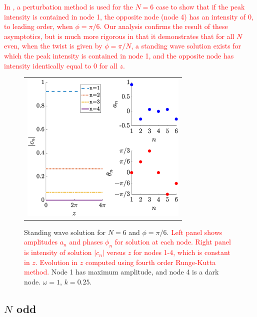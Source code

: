 \documentclass[reprint, amsmath,amssymb,aps,pra]{revtex4-2}
\renewcommand{\revised}[1]{ \textcolor{red}{#1} }
\begin{document}
\revised{In \cite{castro2016}, a perturbation method is used for the $N=6$ case to show that if the peak intensity is contained in node 1, the opposite node (node 4) has an intensity of 0, to leading order, when $\phi=\pi/6$. Our analysis confirms the result of these asymptotics, but is much more rigorous in that it demonstrates that for all $N$ even, when the twist is given by $\phi = \pi/N$, a standing wave solution exists for which the peak intensity is contained in node 1, and the opposite node has intensity identically equal to 0 for all $z$. }

\begin{figure}
\begin{center}
\begin{tabular}{c}
\includegraphics[width=8cm]{evenhole6.eps}
\end{tabular}
\end{center}
\caption{Standing wave solution for $N = 6$ and $\phi = \pi/6$. \revised{Left panel shows amplitudes $a_n$ and phases $\phi_n$ for solution at each node. Right panel is intensity of solution $|c_n|$ versus $z$ for nodes 1-4, which is constant in $z$. Evolution in $z$ computed using fourth order Runge-Kutta method.} Node 1 has maximum amplitude, and node 4 is a dark node. $\omega = 1$, $k = 0.25$.}
\label{fig:evenhole6}
\end{figure}

\subsection{\texorpdfstring{$N$}{N} odd}\label{sec:Nodd}
\end{document}
